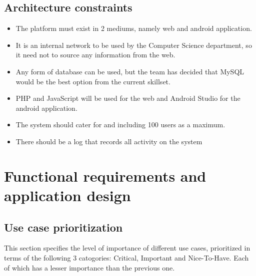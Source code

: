 \documentclass[11pt]{article}
\begin{document}
	\subsection{Architecture constraints}
	
	\begin{itemize}
		\item The platform must exist in 2 mediums, namely web and android application.
		\item It is an internal network to be used by the Computer Science department, so it need not to source any information from the web.
		\item Any form of database can be used, but the team has decided that MySQL would be the best option from the current skillset.
		\item PHP and JavaScript will be used for the web and Android Studio for the android application.
		\item The system should cater for and including 100 users as a maximum.
		\item There should be a log that records all activity on the system
	\end{itemize}
	
	\newpage
	
	\section{Functional requirements and application design}
	
	\subsection{Use case prioritization}
	This section specifies the level of importance of different use cases, prioritized in terms of the following 3 catogories: Critical, Important and Nice-To-Have. Each of which has a lesser importance than the previous one.
	
\end{document}
